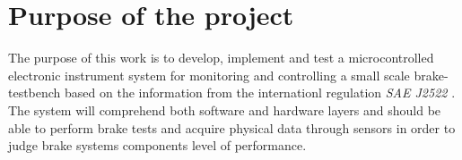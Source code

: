 	\section{Purpose of the project}\label{sec:purpose}
		The purpose of this work is to develop, implement and test a microcontrolled electronic instrument system for monitoring and controlling a small scale brake-testbench based on the information from the internationl regulation \textit{SAE J2522} \cite{sae}. The system will comprehend both software and hardware layers and should be able to perform brake tests and acquire physical data through sensors in order to judge brake systems components level of performance.